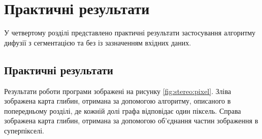 \chapter{Практичні результати}

У четвертому розділі представлено практичні результати
застосування алгоритму дифузії з сегментацією
та без із зазначенням вхідних даних.

\section{Практичні результати}

Результати роботи програми зображені на рисунку \ref{fig:stereo:pixel}.
Зліва зображена карта глибин, отримана за допомогою алгоритму,
описаного в попередньому розділі, де кожній долі графа відповідає один піксель.
Справа зображена карта глибин,
отримана за допомогою об'єднання частин зображення в суперпікселі.

